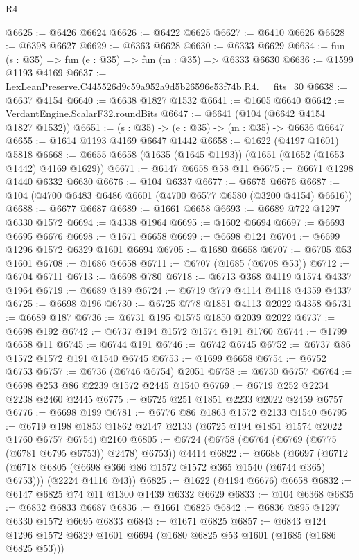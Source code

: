 \begin{lexlean}{R4}
\begin{coremodule}
@6625 := @6426 @6624
@6626 := @6422 @6625
@6627 := @6410 @6626
@6628 := @6398 @6627
@6629 := @6363 @6628
@6630 := @6333 @6629
@6634 := fun (s : @35) => fun (e : @35) => fun (m : @35) => @6333 @6630
@6636 := @1599 @1193 @4169
@6637 := LexLeanPreserve.C445526d9c59a952a9d5b26596e53f74b.R4.__fits_30
@6638 := @6637 @4154
@6640 := @6638 @1827 @1532
@6641 := @1605 @6640
@6642 := VerdantEngine.ScalarF32.roundBits
@6647 := @6641 (@104 (@6642 @4154 @1827 @1532))
@6651 := (s : @35) -> (e : @35) -> (m : @35) -> @6636 @6647
@6655 := @1614 @1193 @4169 @6647 @1442
@6658 := @1622 (@4197 @1601) @5818
@6668 := @6655 @6658 (@1635 (@1645 @1193)) (@1651 (@1652 (@1653 @1442) @4169 @1629))
@6671 := @6147 @6658 @58 @11
@6675 := @6671 @1298 @1440 @6332 @6630
@6676 := @104 @6337
@6677 := @6675 @6676
@6687 := @104 (@4700 @6483 @6486 @6601 (@4700 @6577 @6580 (@3200 @4154) @6616))
@6688 := @6677 @6687
@6689 := @1661 @6658
@6693 := @6689 @722 @1297 @6330 @1572
@6694 := @4338 @1964
@6695 := @1602 @6694
@6697 := @6693 @6695 @6676
@6698 := @1671 @6658
@6699 := @6698 @124
@6704 := @6699 @1296 @1572 @6329 @1601 @6694
@6705 := @1680 @6658
@6707 := @6705 @53 @1601
@6708 := @1686 @6658
@6711 := @6707 (@1685 (@6708 @53))
@6712 := @6704 @6711
@6713 := @6698 @780
@6718 := @6713 @368 @4119 @1574 @4337 @1964
@6719 := @6689 @189
@6724 := @6719 @779 @4114 @4118 @4359 @4337
@6725 := @6698 @196
@6730 := @6725 @778 @1851 @4113 @2022 @4358
@6731 := @6689 @187
@6736 := @6731 @195 @1575 @1850 @2039 @2022
@6737 := @6698 @192
@6742 := @6737 @194 @1572 @1574 @191 @1760
@6744 := @1799 @6658 @11
@6745 := @6744 @191
@6746 := @6742 @6745
@6752 := @6737 @86 @1572 @1572 @191 @1540 @6745
@6753 := @1699 @6658
@6754 := @6752 @6753
@6757 := @6736 (@6746 @6754) @2051
@6758 := @6730 @6757
@6764 := @6698 @253 @86 @2239 @1572 @2445 @1540
@6769 := @6719 @252 @2234 @2238 @2460 @2445
@6775 := @6725 @251 @1851 @2233 @2022 @2459 @6757
@6776 := @6698 @199
@6781 := @6776 @86 @1863 @1572 @2133 @1540
@6795 := @6719 @198 @1853 @1862 @2147 @2133 (@6725 @194 @1851 @1574 @2022 @1760 @6757 @6754) @2160
@6805 := @6724 (@6758 (@6764 (@6769 (@6775 (@6781 @6795 @6753)) @2478) @6753)) @4414
@6822 := @6688
    (@6697
      (@6712 (@6718 @6805 (@6698 @366 @86 @1572 @1572 @365 @1540 (@6744 @365) @6753)))
      (@2224 @4116 @43))
@6825 := @1622 (@4194 @6676) @6658
@6832 := @6147 @6825 @74 @11 @1300 @1439 @6332 @6629
@6833 := @104 @6368
@6835 := @6832 @6833 @6687
@6836 := @1661 @6825
@6842 := @6836 @895 @1297 @6330 @1572 @6695 @6833
@6843 := @1671 @6825
@6857 := @6843 @124 @1296 @1572 @6329 @1601 @6694 (@1680 @6825 @53 @1601 (@1685 (@1686 @6825 @53)))

\end{coremodule}
\end{lexlean}
